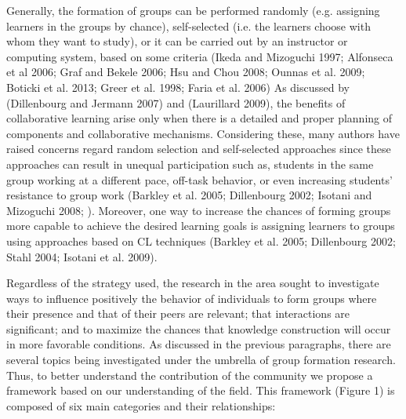 Generally, the formation of groups can be performed randomly (e.g. assigning learners in the groups by chance), self-selected (i.e. the learners choose with whom they want to study), or it can be carried out by an instructor or computing system, based on some criteria (Ikeda and Mizoguchi 1997; Alfonseca et al 2006; Graf and Bekele 2006; Hsu and Chou 2008; Ounnas et al. 2009; Boticki et al. 2013; Greer et al. 1998; Faria et al. 2006)
As discussed by (Dillenbourg and Jermann 2007) and (Laurillard 2009), the benefits of collaborative learning arise only when there is a detailed and proper planning of components and collaborative mechanisms. Considering these, many authors have raised concerns regard random selection and self-selected approaches since these approaches can result in unequal participation such as, students in the same group working at a different pace, off-task behavior, or even increasing students’ resistance to group work (Barkley et al. 2005; Dillenbourg 2002; Isotani and Mizoguchi 2008; ). Moreover, one way to increase the chances of forming groups more capable to achieve the desired learning goals is assigning learners to groups using approaches based on CL techniques (Barkley et al. 2005; Dillenbourg 2002; Stahl 2004; Isotani et al. 2009).

Regardless of the strategy used, the research in the area sought to investigate ways to influence positively the behavior of individuals to form groups where their presence and that of their peers are relevant; that interactions are significant; and to maximize the chances that knowledge construction will occur in more favorable conditions. 
As discussed in the previous paragraphs, there are several topics being investigated under the umbrella of group formation research. Thus, to better understand the contribution of the community we propose a framework based on our understanding of the field. This framework (Figure 1) is composed of six main categories and their relationships: 

